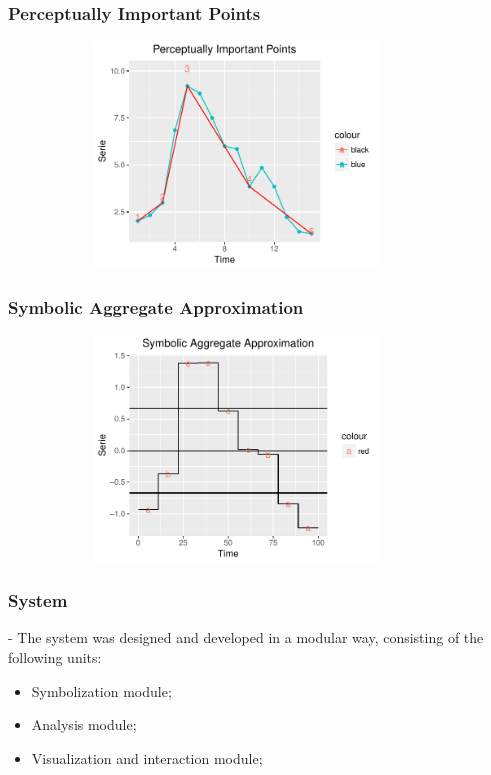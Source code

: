 \documentclass[10pt, compress]{beamer}
\begin{document}
\begin{frame}[fragile]
\frametitle{Perceptually Important Points}
\begin{figure}
  \centering
   \includegraphics[width=10cm,height=6cm]{PIP.pdf}
\end{figure}
\end{frame}

\begin{frame}[fragile]
\frametitle{Symbolic Aggregate Approximation}
\begin{figure}
  \centering
   \includegraphics[width=10cm,height=6cm]{SAX.pdf}
\end{figure}
\end{frame}

\begin{frame}[fragile]
\frametitle{System}

- The system was designed and developed in a modular way, consisting of the following units:

\begin{itemize}
\item Symbolization module;
\item Analysis module;
\item Visualization and interaction module;
\end{itemize} 

\end{frame}
\end{document}
